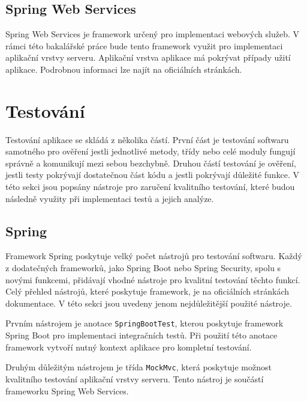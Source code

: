     \subsection{Spring Web Services}
        Spring Web Services je framework určený pro implementaci webových služeb. V rámci této bakalářské práce bude tento framework využit pro implementaci aplikační vrstvy serveru. Aplikační vrstva aplikace má pokrývat případy užití aplikace. Podrobnou informaci lze najít na oficiálních stránkách\cite{spring-web-services}.
        

    
\section{Testování}\label{resere:testovani}
    Testování aplikace se skládá z několika částí. První část je testování softwaru samotného pro ověření jestli jednotlivé metody, třídy nebo celé moduly fungují správně a komunikují mezi sebou bezchybně. Druhou částí testování je ověření, jestli testy pokrývají dostatečnou část kódu a jestli pokrývají důležité funkce. V této sekci jsou popsány nástroje pro zaručení kvalitního testování, které budou následně využity při implementaci testů a jejich analýze.
    
    \subsection{Spring}
        Framework Spring poskytuje velký počet nástrojů pro testování softwaru. Každý z dodatečných frameworků, jako Spring Boot nebo Spring Security, spolu s novými funkcemi, přidávají vhodné nástroje pro kvalitní testování těchto funkcí. Celý přehled nástrojů, které poskytuje framework, je na oficiálních stránkách dokumentace\cite{spring-tests-doc}. V této sekci jsou uvedeny jenom nejdůležitější použité nástroje.
        
        Prvním nástrojem je anotace \texttt{SpringBootTest}, kterou poskytuje framework Spring Boot pro implementaci integračních testů. Při použití této anotace framework vytvoří nutný kontext aplikace pro kompletní testování.
        
        Druhým důležitým nástrojem je třída \texttt{MockMvc}, která poskytuje možnost kvalitního testování aplikační vrstvy serveru. Tento nástroj je součástí frameworku Spring Web Services.
        
